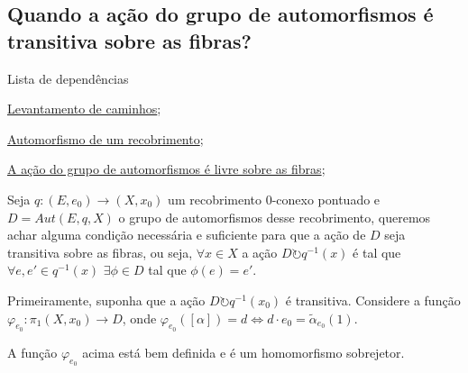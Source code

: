 \subsection{Quando a ação do grupo de automorfismos é transitiva sobre as fibras?}
\label{acao-de-automorfismo-transitiva-prop}
\begin{titlemize}{Lista de dependências}
    \item \hyperref[levantamento-de-caminhos-prop]{Levantamento de caminhos};\\
	\item \hyperref[automorfismo-de-recobrimento-def]{Automorfismo de um recobrimento};\\
    \item \hyperref[acao-de-automorfismos-e-livre-prop]{A ação do grupo de automorfismos é livre sobre as fibras};
\end{titlemize}
Seja $q:(E, e_0) \longrightarrow (X, x_0)$ um recobrimento 0-conexo pontuado e $D=Aut(E, q, X)$ o grupo de automorfismos desse recobrimento, queremos achar alguma condição necessária e suficiente para que a ação de $D$ seja transitiva sobre as fibras, ou seja, $\forall x \in X$ a ação $D \circlearrowright q^{-1}(x)$ é tal que $\forall e, e' \in q^{-1}(x)$ $\exists \phi \in D$ tal que $\phi(e) = e'$.

Primeiramente, suponha que a ação $D \circlearrowright q^{-1}(x_0)$ é transitiva. Considere a função $\varphi_{e_0}:\pi_1(X, x_0) \longrightarrow D$, onde $\varphi_{e_0}([\alpha]) = d \Longleftrightarrow d \cdot e_0 = \tilde \alpha_{e_0}(1)$.

\begin{af}
    A função $\varphi_{e_0}$ acima está bem definida e é um homomorfismo sobrejetor.
\end{af}

